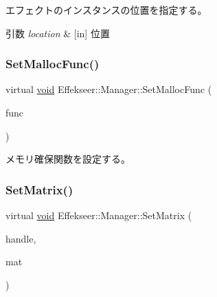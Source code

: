 エフェクトのインスタンスの位置を指定する。 


\begin{DoxyParams}{引数}
{\em location} & \mbox{[}in\mbox{]} 位置 \\
\hline
\end{DoxyParams}
\mbox{\label{class_effekseer_1_1_manager_af1b85d9b77c7e923a399c3cc84a34fbc}} 
\subsubsection{\texorpdfstring{Set\+Malloc\+Func()}{SetMallocFunc()}}
{\footnotesize\ttfamily virtual \mbox{\hyperlink{namespace_effekseer_ab34c4088e512200cf4c2716f168deb56}{void}} Effekseer\+::\+Manager\+::\+Set\+Malloc\+Func (\begin{DoxyParamCaption}\item[{\mbox{\hyperlink{namespace_effekseer_a2f9a04a7b2d08a8f2173ce47e57ff742}{Malloc\+Func}}}]{func }\end{DoxyParamCaption})\hspace{0.3cm}{\ttfamily [pure virtual]}}



メモリ確保関数を設定する。 

\mbox{\label{class_effekseer_1_1_manager_a69d0768ed69c30d3993ececa6159c4dd}} 
\subsubsection{\texorpdfstring{Set\+Matrix()}{SetMatrix()}}
{\footnotesize\ttfamily virtual \mbox{\hyperlink{namespace_effekseer_ab34c4088e512200cf4c2716f168deb56}{void}} Effekseer\+::\+Manager\+::\+Set\+Matrix (\begin{DoxyParamCaption}\item[{\mbox{\hyperlink{namespace_effekseer_afba58b8d812da862190e9bbfc040824a}{Handle}}}]{handle,  }\item[{const \mbox{\hyperlink{struct_effekseer_1_1_matrix43}{Matrix43}} \&}]{mat }\end{DoxyParamCaption})\hspace{0.3cm}{\ttfamily [pure virtual]}}



